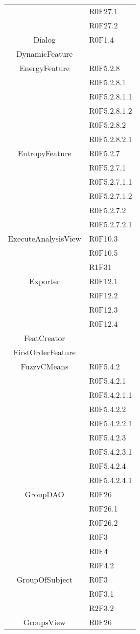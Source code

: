 \begin{center}
\begin{longtable}{|c|l|}
 & R0F27.1 \\
 & R0F27.2 \\
\hline 
Dialog & R0F1.4 \\
\hline 
DynamicFeature &  \\
\hline 
EnergyFeature & R0F5.2.8 \\
 & R0F5.2.8.1 \\
 & R0F5.2.8.1.1 \\
 & R0F5.2.8.1.2 \\
 & R0F5.2.8.2 \\
 & R0F5.2.8.2.1 \\
\hline 
EntropyFeature & R0F5.2.7 \\
 & R0F5.2.7.1 \\
 & R0F5.2.7.1.1 \\
 & R0F5.2.7.1.2 \\
 & R0F5.2.7.2 \\
 & R0F5.2.7.2.1 \\
\hline 
ExecuteAnalysisView & R0F10.3 \\
 & R0F10.5  \\
 & R1F31 \\
\hline 
Exporter & R0F12.1 \\
 & R0F12.2 \\
 & R0F12.3 \\
 & R0F12.4 \\
\hline 
FeatCreator &  \\
\hline 
FirstOrderFeature &  \\
\hline 
FuzzyCMeans & R0F5.4.2 \\
 & R0F5.4.2.1 \\
 & R0F5.4.2.1.1 \\
 & R0F5.4.2.2 \\
 & R0F5.4.2.2.1 \\
 & R0F5.4.2.3 \\
 & R0F5.4.2.3.1 \\
 & R0F5.4.2.4 \\
 & R0F5.4.2.4.1 \\
\hline 
GroupDAO & R0F26 \\
 & R0F26.1 \\
 & R0F26.2 \\
 & R0F3 \\
 & R0F4 \\
 & R0F4.2 \\
\hline 
GroupOfSubject & R0F3 \\
 & R0F3.1 \\
 & R2F3.2 \\
\hline 
GroupsView & R0F26 \\

\end{longtable}
\end{center}
